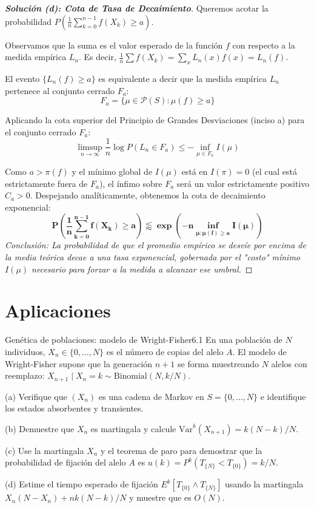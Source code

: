 \documentclass[10pt,a4paper]{article}
\begin{document}
\begin{proof}[\textbf{Solución (d): Cota de Tasa de Decaimiento}]
    Queremos acotar la probabilidad $P \left( \frac{1}{n} \sum_{k=0}^{n-1} f(X_k) \ge a \right)$.
    
    Observamos que la suma es el valor esperado de la función $f$ con respecto a la medida empírica $L_n$. 
    Es decir, $\frac{1}{n} \sum f(X_k) = \sum_x L_n(x) f(x) = L_n(f)$.
    
    El evento $\{ L_n(f) \ge a \}$ es equivalente a decir que la medida empírica $L_n$ pertenece al conjunto cerrado $F_a$:
    \[ F_a = \{ \mu \in \mathcal{P}(S) : \mu(f) \ge a \} \]
    
    Aplicando la cota superior del Principio de Grandes Desviaciones (inciso a) para el conjunto cerrado $F_a$:
    \[ \limsup_{n \to \infty} \frac{1}{n} \log P(L_n \in F_a) \le -\inf_{\mu \in F_a} I(\mu) \]
    
    Como $a > \pi(f)$ y el mínimo global de $I(\mu)$ está en $I(\pi)=0$ (el cual está estrictamente fuera de $F_a$), el ínfimo sobre $F_a$ será un valor estrictamente positivo $C_a > 0$.
    Despejando analíticamente, obtenemos la cota de decaimiento exponencial:
    \[ \mathbf{P \left( \frac{1}{n} \sum_{k=0}^{n-1} f(X_k) \ge a \right) \lessapprox \exp\left( -n \inf_{\mu : \mu(f) \ge a} I(\mu) \right)} \]
    \textit{Conclusión: La probabilidad de que el promedio empírico se desvíe por encima de la media teórica decae a una tasa exponencial, gobernada por el "costo" mínimo $I(\mu)$ necesario para forzar a la medida a alcanzar ese umbral.}
\end{proof}


\newpage

\section{Aplicaciones}



\begin{ejercicio}{Genética de poblaciones: modelo de Wright-Fisher}{6.1}
    En una población de $N$ individuos, $X_n \in \{0, \dots, N\}$ es el número de copias del alelo $A$. El modelo de Wright-Fisher supone que la generación $n+1$ se forma muestreando $N$ alelos con reemplazo: $X_{n+1} \mid X_n = k \sim \text{Binomial}(N, k/N)$.
    
    (a) Verifique que $(X_n)$ es una cadena de Markov en $S = \{0, \dots, N\}$ e identifique los estados absorbentes y transientes.
    
    (b) Demuestre que $X_n$ es martingala y calcule $\text{Var}^k(X_{n+1}) = k(N-k)/N$.
    
    (c) Use la martingala $X_n$ y el teorema de paro para demostrar que la probabilidad de fijación del alelo $A$ es $u(k) = P^k(T_{\{N\}} < T_{\{0\}}) = k/N$.
    
    (d) Estime el tiempo esperado de fijación $E^k[T_{\{0\}} \wedge T_{\{N\}}]$ usando la martingala $X_n(N-X_n) + nk(N-k)/N$ y muestre que es $O(N)$.
\end{ejercicio}
\end{document}
